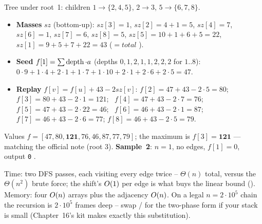 \begin{tracebox}[Official Sample 1 -- values 9 4 1 7 10 1 6 5, total = 43, rooted at vertex 1]
Tree under root~1: children $1\!\to\!\{2,4,5\}$, $2\!\to\!3$, $5\!\to\!\{6,7,8\}$.
\begin{itemize}[nosep,leftmargin=1.3em]
  \item \textbf{Masses} $\mathit{sz}$ (bottom-up): $\mathit{sz}[3]=1$, $\mathit{sz}[2]=4+1=5$,
        $\mathit{sz}[4]=7$, $\mathit{sz}[6]=1$, $\mathit{sz}[7]=6$, $\mathit{sz}[8]=5$,
        $\mathit{sz}[5]=10{+}1{+}6{+}5=22$, $\mathit{sz}[1]=9{+}5{+}7{+}22=43$ ($=\mathit{total}$
        \checkmark).
  \item \textbf{Seed} $f[1]=\sum \operatorname{depth}\cdot a$ (depths $0,1,2,1,1,2,2,2$ for $1..8$):
        $0\cdot9+1\cdot4+2\cdot1+1\cdot7+1\cdot10+2\cdot1+2\cdot6+2\cdot5 = 47$.
  \item \textbf{Replay} $f[v]=f[u]+43-2\mathit{sz}[v]$:
        $f[2]=47+43-2{\cdot}5=80$; \ $f[3]=80+43-2{\cdot}1=121$; \ $f[4]=47+43-2{\cdot}7=76$;
        $f[5]=47+43-2{\cdot}22=46$; \ $f[6]=46+43-2{\cdot}1=87$; \ $f[7]=46+43-2{\cdot}6=77$;
        $f[8]=46+43-2{\cdot}5=79$.
\end{itemize}
Values $f=[47,80,\mathbf{121},76,46,87,77,79]$; the maximum is $f[3]=\mathbf{121}$ \checkmark ---
matching the official note (root $3$). \textbf{Sample~2}: $n=1$, no edges, $f[1]=0$, output
\texttt{0} \checkmark.
\end{tracebox}

\begin{complexitybox}
Time: two DFS passes, each visiting every edge twice -- $\Theta(n)$ total, versus the
$\Theta(n^2)$ brute force; the shift's $O(1)$ per edge is what buys the linear bound
(). Memory: four $O(n)$  arrays plus the adjacency
$O(n)$. On a legal $n=2\cdot10^{5}$ chain the recursion is $2\cdot10^{5}$ frames deep --
swap / for the  two-phase form if your stack is small
(Chapter~16's kit makes exactly this substitution).
\end{complexitybox}

